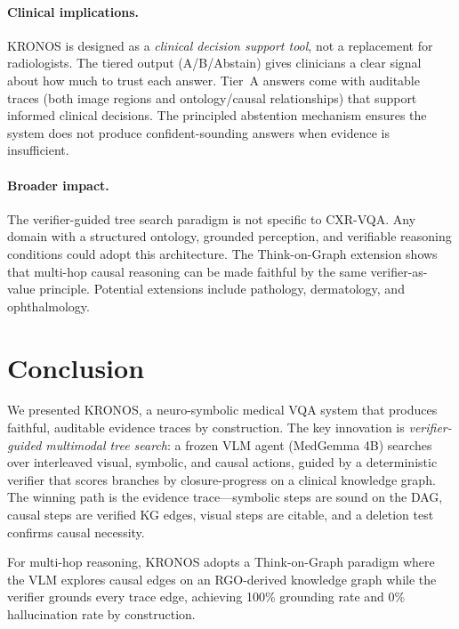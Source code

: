 \documentclass[runningheads]{llncs}
\begin{document}
\paragraph{Clinical implications.}
KRONOS is designed as a \emph{clinical decision support tool}, not a
replacement for radiologists.
The tiered output (A/B/Abstain) gives clinicians a clear signal about how
much to trust each answer.
Tier~A answers come with auditable traces (both image regions and
ontology/causal relationships) that support informed clinical decisions.
The principled abstention mechanism ensures the system does not produce
confident-sounding answers when evidence is insufficient.

\paragraph{Broader impact.}
The verifier-guided tree search paradigm is not specific to CXR-VQA.
Any domain with a structured ontology, grounded perception, and
verifiable reasoning conditions could adopt this architecture.
The Think-on-Graph extension shows that multi-hop causal reasoning can
be made faithful by the same verifier-as-value principle.
Potential extensions include pathology, dermatology, and ophthalmology.

\section{Conclusion}
\label{sec:conclusion}

We presented KRONOS, a neuro-symbolic medical VQA system that produces
faithful, auditable evidence traces by construction.
The key innovation is \emph{verifier-guided multimodal tree search}:
a frozen VLM agent (MedGemma 4B) searches over interleaved visual,
symbolic, and causal actions, guided by a deterministic verifier that
scores branches by closure-progress on a clinical knowledge graph.
The winning path is the evidence trace---symbolic steps are sound on the
DAG, causal steps are verified KG edges, visual steps are citable, and a
deletion test confirms causal necessity.

For multi-hop reasoning, KRONOS adopts a Think-on-Graph paradigm where the
VLM explores causal edges on an RGO-derived knowledge graph while the
verifier grounds every trace edge, achieving 100\% grounding rate and 0\%
hallucination rate by construction.
\end{document}
